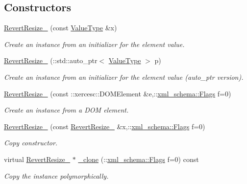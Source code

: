 \subsection*{Constructors}
\begin{DoxyCompactItemize}
\item 
\hyperlink{classopenstack_1_1xml_1_1RevertResize___ad83715f0f2ccbb53ab872b9772d90c3e}{RevertResize\_\-} (const \hyperlink{classopenstack_1_1xml_1_1RevertResize}{ValueType} \&x)
\begin{DoxyCompactList}\small\item\em Create an instance from an initializer for the element value. \item\end{DoxyCompactList}\item 
\hyperlink{classopenstack_1_1xml_1_1RevertResize___a55b93966df2ea42cffaad3035f42ccda}{RevertResize\_\-} (::std::auto\_\-ptr$<$ \hyperlink{classopenstack_1_1xml_1_1RevertResize}{ValueType} $>$ p)
\begin{DoxyCompactList}\small\item\em Create an instance from an initializer for the element value (auto\_\-ptr version). \item\end{DoxyCompactList}\item 
\hyperlink{classopenstack_1_1xml_1_1RevertResize___adc78a2c1285cdc3cd882afc7f74d8d0f}{RevertResize\_\-} (const ::xercesc::DOMElement \&e,::\hyperlink{namespacexml__schema_affb4c227cbd9aa7453dd1dc5a1401943}{xml\_\-schema::Flags} f=0)
\begin{DoxyCompactList}\small\item\em Create an instance from a DOM element. \item\end{DoxyCompactList}\item 
\hyperlink{classopenstack_1_1xml_1_1RevertResize___a6cf000af6246292b7f843fb0c45a1261}{RevertResize\_\-} (const \hyperlink{classopenstack_1_1xml_1_1RevertResize__}{RevertResize\_\-} \&x,::\hyperlink{namespacexml__schema_affb4c227cbd9aa7453dd1dc5a1401943}{xml\_\-schema::Flags} f=0)
\begin{DoxyCompactList}\small\item\em Copy constructor. \item\end{DoxyCompactList}\item 
virtual \hyperlink{classopenstack_1_1xml_1_1RevertResize__}{RevertResize\_\-} $\ast$ \hyperlink{classopenstack_1_1xml_1_1RevertResize___a8ecb49f7233021293f6feb186740ff1f}{\_\-clone} (::\hyperlink{namespacexml__schema_affb4c227cbd9aa7453dd1dc5a1401943}{xml\_\-schema::Flags} f=0) const 
\begin{DoxyCompactList}\small\item\em Copy the instance polymorphically. \item\end{DoxyCompactList}\end{DoxyCompactItemize}
